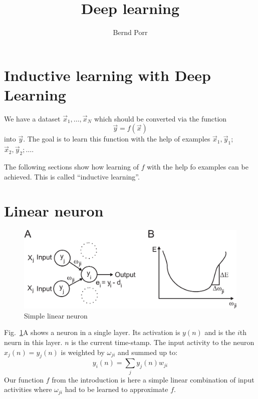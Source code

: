 \documentclass[12pt]{article}
\author{Bernd Porr}
\title{Deep learning}
\begin{document}
\maketitle

\section{Inductive learning with Deep Learning}
We have a dataset $\vec{x}_1, \ldots, \vec{x}_N$ which should be converted
via the function
\begin{equation}
  \vec{y}=f(\vec{x}) \label{inductive}
\end{equation}
into $\vec{y}$.  The goal is to learn this function with the help of
examples $\vec{x}_1,\vec{y}_1$; $\vec{x}_2,\vec{y}_2; \ldots$.

The following sections show how learning of $f$ with the help
fo examples can be achieved. This is called ``inductive learning''.

\section{Linear neuron}

\begin{figure}[!hbt]
\begin{center}
\mbox{\includegraphics[width=\textwidth]{one_layer}}
\end{center}
\caption{Simple linear neuron
\label{one_layer}}
\end{figure}

Fig.~\ref{one_layer}A shows a neuron in a single layer.
Its activation is $y(n)$ and is the $i$th neurn in this layer.
$n$ is the current time-stamp. The input activity to the neuron $x_j(n) =
y_j(n)$ is weighted by $\omega_{ji}$ and summed up to:
\begin{equation}
  y_i(n) = \sum_j y_j(n) w_{ji} \label{linear_sum}
\end{equation}
Our function $f$ from the introduction is here a simple linear
combination of input activities where $\omega_{ji}$ had to be learned
to approximate $f$.
\end{document}

